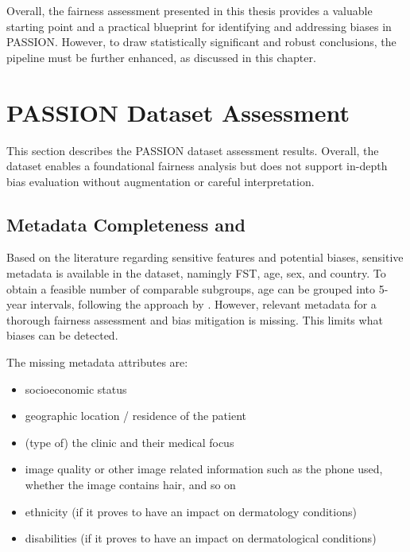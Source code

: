 \documentclass[12pt, a4paper, oneside]{book}   	%
\begin{document}
		Overall, the fairness assessment presented in this thesis provides a valuable starting point and a practical blueprint for identifying and addressing biases in PASSION. However, to draw statistically significant and robust conclusions, the pipeline must be further enhanced, as discussed in this chapter.
		
		\section{PASSION Dataset Assessment}
		This section describes the PASSION dataset assessment results.
		Overall, the dataset enables a foundational fairness analysis but does not support in-depth bias evaluation without augmentation or careful interpretation.
		
		\subsection{Metadata Completeness and } \label{chap:datasetAssessmentMetadataEvaluation}
		Based on the literature regarding sensitive features and potential biases, sensitive metadata is available in the dataset, namingly \gls{FST}, age, sex, and country. To obtain a feasible number of comparable subgroups, age can be grouped into 5-year intervals, following the approach by \textcite{Gottfrois2024}.
		However, relevant metadata for a thorough fairness assessment and bias mitigation is missing. This limits what biases can be detected.
		
		The missing metadata attributes are:
		\begin{itemize}
			\item socioeconomic status
			\item geographic location / residence of the patient
			\item (type of) the clinic and their medical focus
			\item image quality or other image related information such as the phone used, whether the image contains hair, and so on
			\item ethnicity (if it proves to have an impact on dermatology conditions)
			\item disabilities (if it proves to have an impact on dermatological conditions)
		\end{itemize}
		
\end{document}
